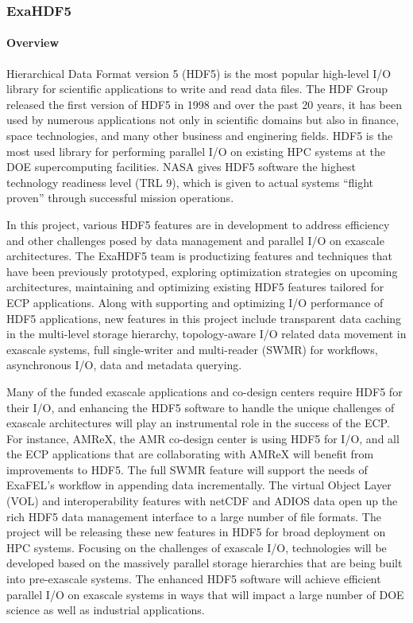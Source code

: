 \subsubsection{ ExaHDF5}\label{subsubsect:exahdf5}

\paragraph{Overview} 

Hierarchical Data Format version 5 (HDF5) is the most popular high-level I/O library for scientific applications to write and read data files. The HDF Group released the first version of HDF5 in 1998 and over the past 20 years, it has been used by numerous applications not only in scientific domains but also in finance, space technologies, and many other business and enginering fields. HDF5 is the most used library for performing parallel I/O on existing HPC systems at the DOE supercomputing facilities. NASA gives HDF5 software the highest technology readiness level (TRL 9), which is given to actual systems ``flight proven'' through successful mission operations.

In this project, various HDF5 features are in development to address efficiency and other challenges posed by data management and parallel I/O on exascale architectures. The ExaHDF5 team is productizing features and techniques that have been previously prototyped, exploring optimization strategies on upcoming architectures, maintaining and optimizing existing HDF5 features tailored for ECP applications. Along with supporting and optimizing I/O performance of HDF5 applications, new features in this project include transparent data caching in the multi-level storage hierarchy, topology-aware I/O related data movement in exascale systems, full single-writer and multi-reader (SWMR) for workflows, asynchronous I/O, data and metadata querying. 

Many of the funded exascale applications and co-design centers require HDF5 for their I/O, and enhancing the HDF5 software to handle the unique challenges of exascale architectures will play an instrumental role in the success of the ECP. For instance, AMReX, the AMR co-design center is using HDF5 for I/O, and all the ECP applications that are collaborating with AMReX will benefit from improvements to HDF5. The full SWMR feature will support the needs of ExaFEL’s workflow in appending data incrementally. The virtual Object Layer (VOL) and interoperability features with netCDF and ADIOS data open up the rich HDF5 data management interface to a large number of file formats. The project will be releasing these new features in HDF5 for broad deployment on HPC systems. Focusing on the challenges of exascale I/O, technologies will be developed based on the massively parallel storage hierarchies that are being built into pre-exascale systems. The enhanced HDF5 software will achieve efficient parallel I/O on exascale systems in ways that will impact a large number of DOE science as well as industrial applications.

